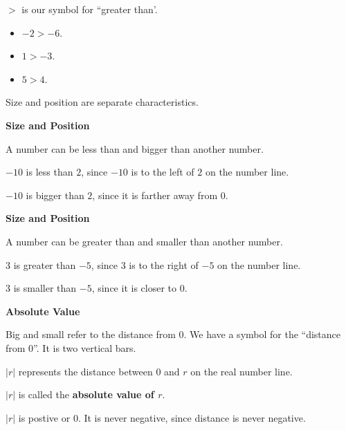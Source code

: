 \documentclass{ximera}
\begin{document}
$>$ is our symbol for ``greater than'.



\begin{itemize}
\item $-2 > -6$.
\item $1 > -3$.
\item $5 > 4$.
\end{itemize}





Size and position are separate characteristics.

\begin{warning}  \textbf{\textcolor{red!70!black}{Size and Position}}

A number can be less than and bigger than another number.


$-10$ is less than $2$, since $-10$ is to the left of $2$ on the number line.


$-10$ is bigger than $2$, since it is farther away from $0$.

\end{warning}


\begin{warning}  \textbf{\textcolor{red!70!black}{Size and Position}}

A number can be greater than and smaller than another number.


$3$ is greater than $-5$, since $3$ is to the right of $-5$ on the number line.


$3$ is smaller than $-5$, since it is closer to $0$.

\end{warning}



\begin{definition} \textbf{\textcolor{green!50!black}{Absolute Value}} 


Big and small refer to the distance from $0$.  We have a symbol for the ``distance from $0$''. It is two vertical bars.

$| r |$ represents the distance between $0$ and $r$ on the real number line.

$| r |$ is called the \textbf{absolute value of $r$}.


$| r |$ is postive or $0$. It is never negative, since distance is never negative.

\end{definition}
\end{document}
